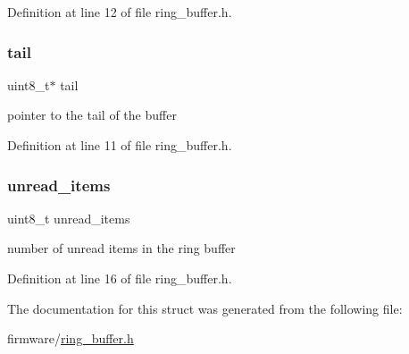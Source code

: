 Definition at line 12 of file ring\+\_\+buffer.\+h.

\hypertarget{structring__buffer__t_af7a2fe8e3fd152742f9d54354ad99db7}{}\label{structring__buffer__t_af7a2fe8e3fd152742f9d54354ad99db7} 
\subsubsection{\texorpdfstring{tail}{tail}}
{\footnotesize\ttfamily uint8\+\_\+t$\ast$ tail}



pointer to the tail of the buffer 



Definition at line 11 of file ring\+\_\+buffer.\+h.

\hypertarget{structring__buffer__t_a0ed89f14dd3a8e0a46a901d73c869804}{}\label{structring__buffer__t_a0ed89f14dd3a8e0a46a901d73c869804} 
\subsubsection{\texorpdfstring{unread\+\_\+items}{unread\_items}}
{\footnotesize\ttfamily uint8\+\_\+t unread\+\_\+items}



number of unread items in the ring buffer 



Definition at line 16 of file ring\+\_\+buffer.\+h.



The documentation for this struct was generated from the following file\+:\begin{DoxyCompactItemize}
\item 
firmware/\hyperlink{ring__buffer_8h}{ring\+\_\+buffer.\+h}\end{DoxyCompactItemize}
